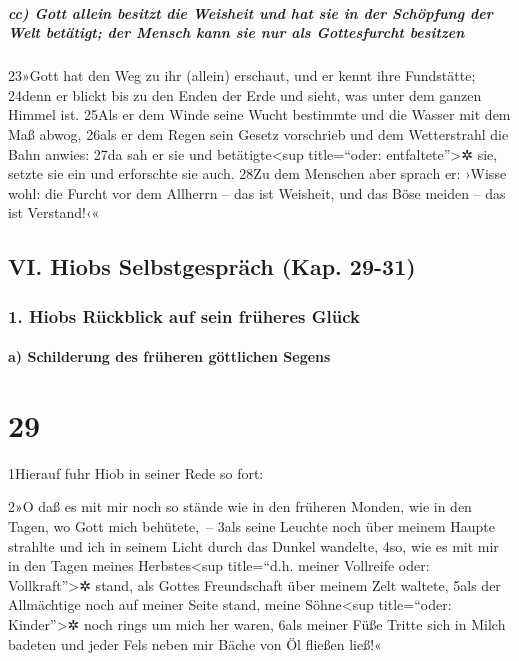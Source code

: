 \hypertarget{cc-gott-allein-besitzt-die-weisheit-und-hat-sie-in-der-schuxf6pfung-der-welt-betuxe4tigt-der-mensch-kann-sie-nur-als-gottesfurcht-besitzen}{%
\subparagraph{cc) Gott allein besitzt die Weisheit und hat sie in der
Schöpfung der Welt betätigt; der Mensch kann sie nur als Gottesfurcht
besitzen}\label{cc-gott-allein-besitzt-die-weisheit-und-hat-sie-in-der-schuxf6pfung-der-welt-betuxe4tigt-der-mensch-kann-sie-nur-als-gottesfurcht-besitzen}}

23»Gott hat den Weg zu ihr (allein) erschaut, und er kennt ihre
Fundstätte; 24denn er blickt bis zu den Enden der Erde und sieht, was
unter dem ganzen Himmel ist. 25Als er dem Winde seine Wucht bestimmte
und die Wasser mit dem Maß abwog, 26als er dem Regen sein Gesetz
vorschrieb und dem Wetterstrahl die Bahn anwies: 27da sah er sie und
betätigte\textless sup title=``oder: entfaltete''\textgreater✲ sie,
setzte sie ein und erforschte sie auch. 28Zu dem Menschen aber sprach
er: ›Wisse wohl: die Furcht vor dem Allherrn -- das ist Weisheit, und
das Böse meiden -- das ist Verstand!‹«

\hypertarget{vi.-hiobs-selbstgespruxe4ch-kap.-29-31}{%
\subsection{VI. Hiobs Selbstgespräch (Kap.
29-31)}\label{vi.-hiobs-selbstgespruxe4ch-kap.-29-31}}

\hypertarget{hiobs-ruxfcckblick-auf-sein-fruxfcheres-gluxfcck}{%
\subsubsection{1. Hiobs Rückblick auf sein früheres
Glück}\label{hiobs-ruxfcckblick-auf-sein-fruxfcheres-gluxfcck}}

\hypertarget{a-schilderung-des-fruxfcheren-guxf6ttlichen-segens}{%
\paragraph{a) Schilderung des früheren göttlichen
Segens}\label{a-schilderung-des-fruxfcheren-guxf6ttlichen-segens}}

\hypertarget{section-28}{%
\section{29}\label{section-28}}

1Hierauf fuhr Hiob in seiner Rede so fort:

2»O daß es mit mir noch so stände wie in den früheren Monden, wie in den
Tagen, wo Gott mich behütete,~-- 3als seine Leuchte noch über meinem
Haupte strahlte und ich in seinem Licht durch das Dunkel wandelte, 4so,
wie es mit mir in den Tagen meines Herbstes\textless sup title=``d.h.
meiner Vollreife oder: Vollkraft''\textgreater✲ stand, als Gottes
Freundschaft über meinem Zelt waltete, 5als der Allmächtige noch auf
meiner Seite stand, meine Söhne\textless sup title=``oder:
Kinder''\textgreater✲ noch rings um mich her waren, 6als meiner Füße
Tritte sich in Milch badeten und jeder Fels neben mir Bäche von Öl
fließen ließ!«

